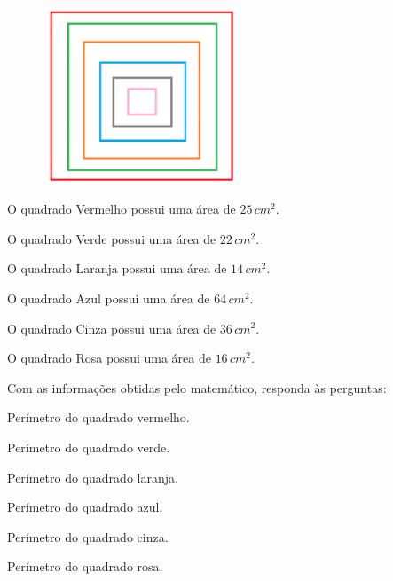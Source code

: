 \begin{figure}[H]
\centering\includegraphics[width=2.3125in,height=2.07917in]{./imgSAEB_8_MAT/media/image2.png}
\end{figure}

O quadrado Vermelho possui uma área de $25\,cm^2$.

O quadrado Verde possui uma área de $22\,cm^2$.

O quadrado Laranja possui uma área de $14\,cm^2$.

O quadrado Azul possui uma área de $64\,cm^2$.

O quadrado Cinza possui uma área de $36\,cm^2$.

O quadrado Rosa possui uma área de $16\,cm^2$.

Com as informações obtidas pelo matemático, responda às perguntas:

\begin{escolha}
\item Perímetro do quadrado vermelho.
\item Perímetro do quadrado verde.
\item Perímetro do quadrado laranja.
\item Perímetro do quadrado azul.
\item Perímetro do quadrado cinza.
\item Perímetro do quadrado rosa.
\end{escolha}


